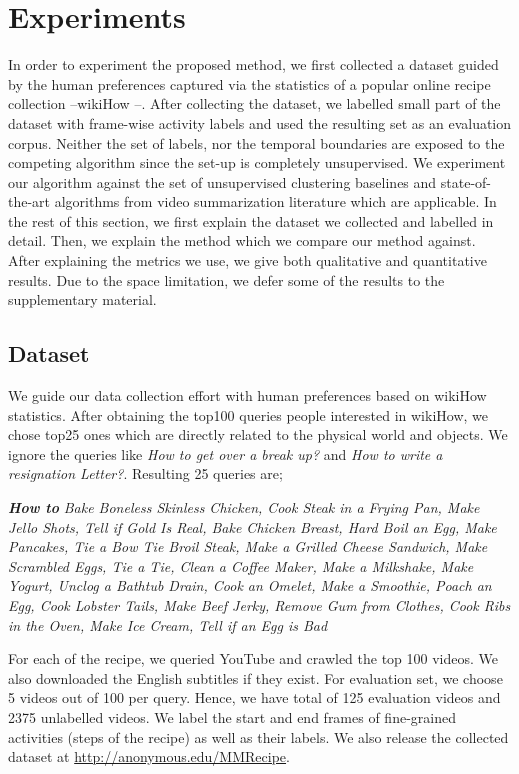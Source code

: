\section{Experiments}
In order to experiment the proposed method, we first collected a dataset guided by the human preferences captured via the statistics of a popular online recipe collection --wikiHow \cite{wikiHow}--. After collecting the dataset, we labelled small part of the dataset with frame-wise activity labels and used the resulting set as an evaluation corpus. Neither the set of labels, nor the temporal boundaries are exposed to the competing algorithm since the set-up is completely unsupervised. We experiment our algorithm against the set of unsupervised clustering baselines and state-of-the-art algorithms from video summarization literature which are applicable. In the rest of this section, we first explain the dataset we collected and labelled in detail. Then, we explain the method which we compare our method against. After explaining the metrics we use, we give both qualitative and quantitative results. Due to the space limitation, we defer some of the results to the supplementary material.

\subsection{Dataset}
\label{dataset:sec}
We guide our data collection effort with human preferences based on wikiHow \cite{wikiHow} statistics. After obtaining the top100 queries people interested in wikiHow, we chose top25 ones which are directly related to the physical world and objects. We ignore the queries like \emph{How to get over a break up‏?‎} and \emph{How to write a resignation Letter?}. Resulting 25 queries are;


\emph{\textbf{How to}}\footnotesize
\emph{Bake Boneless Skinless Chicken, Cook Steak in a Frying Pan, Make Jello Shots, Tell if Gold Is Real, Bake Chicken Breast, Hard Boil an Egg, Make Pancakes, Tie a Bow Tie
Broil Steak, Make a Grilled Cheese Sandwich, Make Scrambled Eggs, Tie a Tie, Clean a Coffee Maker, Make a Milkshake, Make Yogurt, Unclog a Bathtub Drain, Cook an Omelet,
Make a Smoothie, Poach an Egg, Cook Lobster Tails, Make Beef Jerky, Remove Gum from Clothes, Cook Ribs in the Oven, Make Ice Cream, Tell if an Egg is Bad}
\normalsize

For each of the recipe, we queried YouTube and crawled the top 100 videos. We also downloaded the English subtitles if they exist. For evaluation set, we choose 5 videos out of 100 per query. Hence, we have total of 125 evaluation videos and 2375 unlabelled videos. We label the start and end frames of fine-grained activities (\ie steps of the recipe) as well as their labels. We also release the collected dataset at \url{http://anonymous.edu/MMRecipe}.


